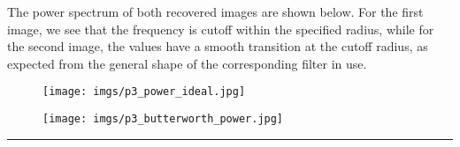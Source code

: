 \documentclass[conference]{styles/acmsiggraph}
\newenvironment{answer}{}{}
\begin{document}
\begin{answer}
		The power spectrum of both recovered images are shown below. For the first image, we see that the frequency is cutoff within the specified radius, while for the second image, the values have a smooth transition at the cutoff radius, as expected from the general shape of the corresponding filter in use.
		\begin{figure}[H]
			\centering
			\texttt{[image: imgs/p3\_power\_ideal.jpg]}
			\end{figure}	
		\begin{figure}[H]
			\centering
			\texttt{[image: imgs/p3\_butterworth\_power.jpg]}
			\end{figure}	
		
	\rule{\textwidth}{0.4pt}
	
\end{answer}
\end{document}
